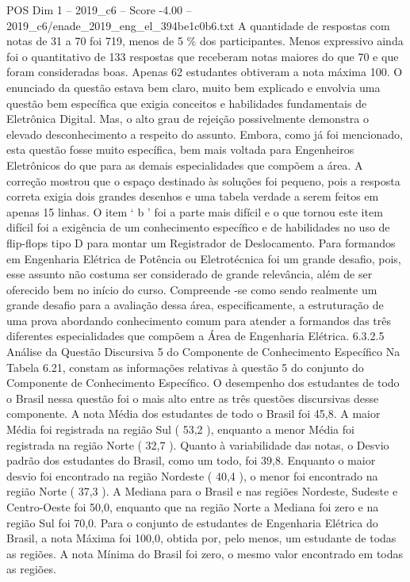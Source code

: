 \begin{textsample}{POS Dim 1 – 2019\_c6 – Score -4.00 – 2019\_c6/enade\_2019\_eng\_el\_394be1c0b6.txt}
A quantidade de respostas com notas de 31 a 70 foi 719, menos de 5 \% dos participantes.
Menos expressivo ainda foi o quantitativo de 133 respostas que receberam notas maiores do que 70 e que foram consideradas boas.
Apenas 62 estudantes obtiveram a nota máxima 100.
O enunciado da questão estava bem claro, muito bem explicado e envolvia uma questão bem específica que exigia conceitos e habilidades fundamentais de Eletrônica Digital.
Mas, o alto grau de rejeição possivelmente demonstra o elevado desconhecimento a respeito do assunto.
Embora, como já foi mencionado, esta questão fosse muito específica, bem mais voltada para Engenheiros Eletrônicos do que para as demais especialidades que compõem a área.
A correção mostrou que o espaço destinado às soluções foi pequeno, pois a resposta correta exigia dois grandes desenhos e uma tabela verdade a serem feitos em apenas 15 linhas.
O item ‘ b ’ foi a parte mais difícil e o que tornou este item difícil foi a exigência de um conhecimento específico e de habilidades no uso de flip-flops tipo D para montar um Registrador de Deslocamento.
Para formandos em Engenharia Elétrica de Potência ou Eletrotécnica foi um grande desafio, pois, esse assunto não costuma ser considerado de grande relevância, além de ser oferecido bem no início do curso.
Compreende -se como sendo realmente um grande desafio para a avaliação dessa área, especificamente, a estruturação de uma prova abordando conhecimento comum para atender a formandos das três diferentes especialidades que compõem a Área de Engenharia Elétrica. 6.3.2.5 Análise da Questão Discursiva 5 do Componente de Conhecimento Específico Na Tabela 6.21, constam as informações relativas à questão 5 do conjunto do Componente de Conhecimento Específico.
O desempenho dos estudantes de todo o Brasil nessa questão foi o mais alto entre as três questões discursivas desse componente.
A nota Média dos estudantes de todo o Brasil foi 45,8.
A maior Média foi registrada na região Sul ( 53,2 ), enquanto a menor Média foi registrada na região Norte ( 32,7 ).
Quanto à variabilidade das notas, o Desvio padrão dos estudantes do Brasil, como um todo, foi 39,8.
Enquanto o maior desvio foi encontrado na região Nordeste ( 40,4 ), o menor foi encontrado na região Norte ( 37,3 ).
A Mediana para o Brasil e nas regiões Nordeste, Sudeste e Centro-Oeste foi 50,0, enquanto que na região Norte a Mediana foi zero e na região Sul foi 70,0.
Para o conjunto de estudantes de Engenharia Elétrica do Brasil, a nota Máxima foi 100,0, obtida por, pelo menos, um estudante de todas as regiões.
A nota Mínima do Brasil foi zero, o mesmo valor encontrado em todas as regiões.

\end{textsample}
